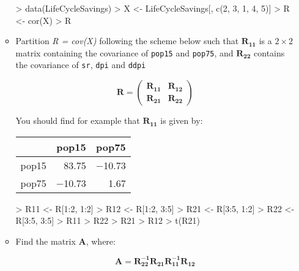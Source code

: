 \begin{enumerate}
\begin{itemize}
\begin{Schunk}
\begin{Sinput}
> data(LifeCycleSavings)
> X <- LifeCycleSavings[, c(2, 3, 1, 4, 5)]
> R <- cor(X)
> R
\end{Sinput}
\end{Schunk}


\item Partition \textit{R = cov(X)} following the scheme below such that $\boldsymbol{R_{11}}$ is a $2 \times 2$ matrix containing the covariance of \texttt{pop15} and \texttt{pop75}, and $\boldsymbol{R_{22}}$ contains the covariance of \texttt{sr}, \texttt{dpi} and \texttt{ddpi}

\begin{displaymath}
\boldsymbol{R} = \left( \begin{array}{l|l} \boldsymbol{R_{11}} & \boldsymbol{R_{12}} \\ \hline    \boldsymbol{R_{21}} & \boldsymbol{R_{22}} \end{array} \right) 
\end{displaymath}

You should find for example that  $\boldsymbol{R_{11}}$ is given by:
\begin{table}[ht]
\begin{center}
\begin{tabular}{rrr}
\hline
 & pop15 & pop75 \\
\hline
pop15 & 83.75 & $-$10.73 \\
pop75 & $-$10.73 & 1.67 \\
\hline
\end{tabular}
\end{center}
\end{table}

\begin{Schunk}
\begin{Sinput}
> R11 <- R[1:2, 1:2]
> R12 <- R[1:2, 3:5]
> R21 <- R[3:5, 1:2]
> R22 <- R[3:5, 3:5]
> R11
> R22
> R21
> R12
> t(R21)
\end{Sinput}
\end{Schunk}


\item Find the matrix $\boldsymbol{A}$, where:

\begin{displaymath}
\boldsymbol{A} = \boldsymbol{R_{22}^{-1}R_{21}R_{11}^{-1}R_{12}}
\end{displaymath}




\end{itemize}
\end{enumerate}
